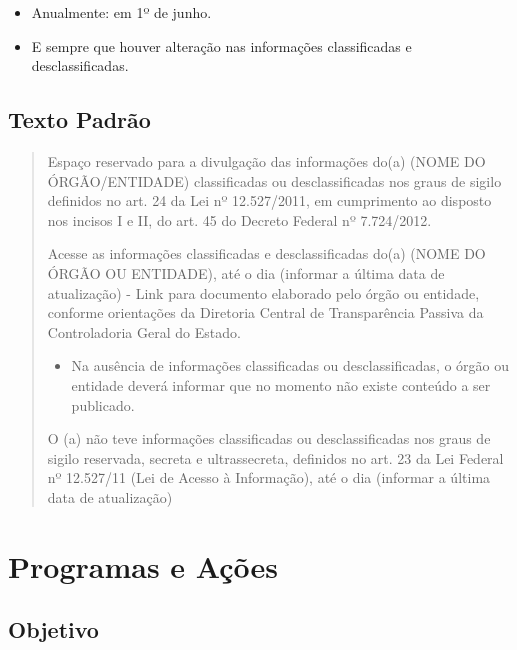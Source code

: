 \documentclass[]{book}
\providecommand{\tightlist}{%
  \setlength{\itemsep}{0pt}\setlength{\parskip}{0pt}}
\begin{document}
\begin{itemize}
\tightlist
\item
  Anualmente: em 1º de junho.
\item
  E sempre que houver alteração nas informações classificadas e desclassificadas.
\end{itemize}

\hypertarget{texto-padruxe3o-2}{%
\subsection{Texto Padrão}\label{texto-padruxe3o-2}}

\begin{quote}
Espaço reservado para a divulgação das informações do(a) (NOME DO ÓRGÃO/ENTIDADE) classificadas ou desclassificadas nos graus de sigilo definidos no art. 24 da Lei nº 12.527/2011, em cumprimento ao disposto nos incisos I e II, do art. 45 do Decreto Federal nº 7.724/2012.

Acesse as informações classificadas e desclassificadas do(a) (NOME DO ÓRGÃO OU ENTIDADE), até o dia (informar a última data de atualização)
- Link para documento elaborado pelo órgão ou entidade, conforme orientações da Diretoria Central de Transparência Passiva da Controladoria Geral do Estado.

\begin{itemize}
\tightlist
\item
  Na ausência de informações classificadas ou desclassificadas, o órgão ou entidade deverá informar que no momento não existe conteúdo a ser publicado.
\end{itemize}

O (a) não teve informações classificadas ou desclassificadas nos graus de sigilo reservada, secreta e ultrassecreta, definidos no art. 23 da Lei Federal nº 12.527/11 (Lei de Acesso à Informação), até o dia (informar a última data de atualização)
\end{quote}

\hypertarget{programas-e-auxe7uxf5es}{%
\section{Programas e Ações}\label{programas-e-auxe7uxf5es}}

\hypertarget{objetivo-2}{%
\subsection{Objetivo}\label{objetivo-2}}
\end{document}
